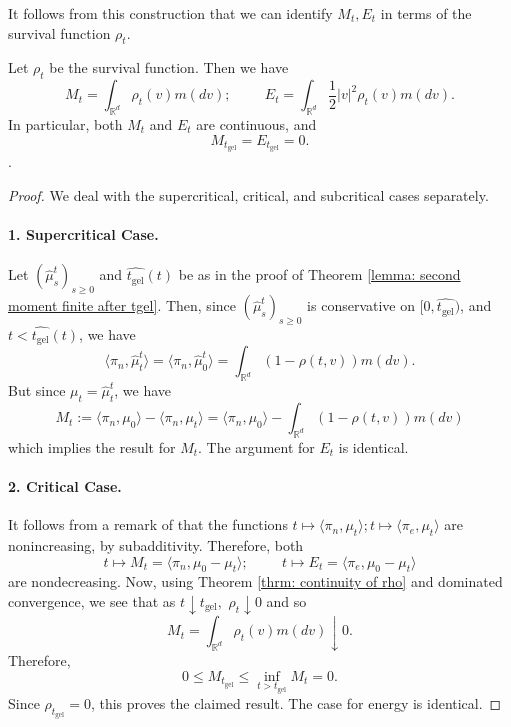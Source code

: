 It follows from this construction that we can identify $M_t, E_t$ in terms of the survival function $\rho_t$. \begin{lemma}\label{lemma: representation of M, E} Let $\rho_t$ be the survival function. Then we have \begin{equation}\label{eq: formula for M, E}
    M_t = \int_{\mathbb{R}^d} \rho_t(v)m(dv); \hspace{1cm} E_t=\int_{\mathbb{R}^d} \frac{1}{2}|v|^2\rho_t(v)m(dv).
\end{equation} In particular, both $M_t$ and $E_t$ are continuous, and \begin{equation}
    M_{t_\text{gel}}=E_{t_\text{gel}}=0.
\end{equation}. \end{lemma} \begin{proof} We deal with the supercritical, critical, and subcritical cases separately. 
\paragraph{1. Supercritical Case.}  Let $(\widehat{\mu}^t_s)_{s\geq 0}$ and $\widehat{t_\text{gel}}(t)$ be as in the proof of Theorem \ref{lemma: second moment finite after tgel}. Then, since $(\widehat{\mu}^t_s)_{s\geq 0}$ is conservative on $[0, \widehat{t_\text{gel}})$, and $t<\widehat{t_\text{gel}}(t)$, we have \begin{equation}
    \langle \pi_n, \widehat{\mu}^t_t\rangle =\langle \pi_n, \widehat{\mu}^t_0\rangle = \int_{\mathbb{R}^d} (1-\rho(t,v))m(dv).
\end{equation} But since $\mu_t=\widehat{\mu}^t_t$, we have \begin{equation}
    M_t:=\langle \pi_n, \mu_0\rangle -\langle \pi_n, \mu_t\rangle =\langle \pi_n, \mu_0\rangle - \int_{\mathbb{R}^d} (1-\rho(t,v))m(dv)
\end{equation} which implies the result for $M_t$. The argument for $E_t$ is identical. 
\paragraph{2. Critical Case.} It follows from a remark of \cite{N00} that the functions $t\mapsto \langle \pi_n, \mu_t\rangle; t\mapsto \langle \pi_e, \mu_t\rangle$ are nonincreasing, by subadditivity. Therefore, both \begin{equation}
    t\mapsto M_t=\langle \pi_n, \mu_0-\mu_t\rangle;\hspace{1cm}  t\mapsto E_t=\langle \pi_e, \mu_0-\mu_t\rangle 
\end{equation} are nondecreasing. Now, using Theorem \ref{thrm: continuity of rho} and dominated convergence, we see that as $t\downarrow t_\text{gel},$ $\rho_t\downarrow 0$ and so \begin{equation}
    M_t =\int_{\mathbb{R}^d} \rho_t(v)m(dv) \downarrow 0. 
\end{equation} Therefore, \begin{equation}
    0 \leq M_{t_\text{gel}} \leq \inf_{t>t_\text{gel}} M_t = 0. 
\end{equation} Since $\rho_{t_\text{gel}}=0$, this proves the claimed result. The case for energy is identical.

\end{proof}
